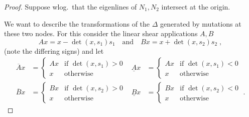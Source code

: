 \documentclass[12pt,a4paper,draft]{scrartcl}
\begin{document}
\begin{proof}
  Suppose wlog.\ that the eigenlines of $N_1,N_2$ intersect at the origin.

  We want to describe the transformations of the $Δ$ generated by mutations at these two nodes.
  For this consider the linear shear applications $A,B$
  \[Ax = x - \det(x,s_1) s_1 \quad \text{and} \quad Bx = x + \det(x,s_2) s_2 \; ,\]
  (note the differing signs) and let
  \begin{align*}
    \overline{A}x &= \begin{cases} Ax &\text{if } \det(x,s_1) > 0 \\ x &\text{otherwise } \end{cases}
                  &
    \underline{A}x &= \begin{cases} Ax &\text{if } \det(x,s_1) < 0 \\ x &\text{otherwise } \end{cases}
    \\
    \overline{B}x &= \begin{cases} Bx &\text{if } \det(x,s_2) > 0 \\ x &\text{otherwise } \end{cases}
                  &
    \underline{B}x &= \begin{cases} Bx &\text{if } \det(x,s_2) < 0 \\ x &\text{otherwise } \end{cases} \; .
  \end{align*}


\end{proof}
\end{document}
